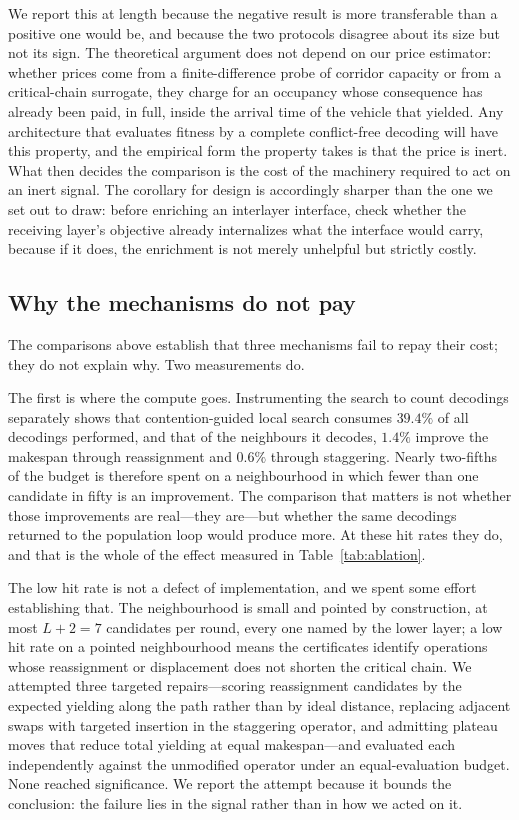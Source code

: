 \documentclass[manuscript,screen,review]{acmart}
\begin{document}
We report this at length because the negative result is more transferable than a
positive one would be, and because the two protocols disagree about its size but
not its sign. The theoretical argument does not depend on our price estimator:
whether prices come from a finite-difference probe of corridor capacity or from a
critical-chain surrogate, they charge for an occupancy whose consequence has
already been paid, in full, inside the arrival time of the vehicle that yielded.
Any architecture that evaluates fitness by a complete conflict-free decoding will
have this property, and the empirical form the property takes is that the price
is inert. What then decides the comparison is the cost of the machinery required
to act on an inert signal. The corollary for design is accordingly sharper than
the one we set out to draw: before enriching an interlayer interface, check
whether the receiving layer's objective already internalizes what the interface
would carry, because if it does, the enrichment is not merely unhelpful but
strictly costly.

\subsection{Why the mechanisms do not pay}
\label{sec:whycost}

The comparisons above establish that three mechanisms fail to repay their cost;
they do not explain why. Two measurements do.

The first is where the compute goes. Instrumenting the search to count
decodings separately shows that contention-guided local search consumes
$39.4\%$ of all decodings performed, and that of the neighbours it decodes,
$1.4\%$ improve the makespan through reassignment and $0.6\%$ through
staggering. Nearly two-fifths of the budget is therefore spent on a
neighbourhood in which fewer than one candidate in fifty is an improvement. The
comparison that matters is not whether those improvements are real---they
are---but whether the same decodings returned to the population loop would
produce more. At these hit rates they do, and that is the whole of the effect
measured in Table~\ref{tab:ablation}.

The low hit rate is not a defect of implementation, and we spent some effort
establishing that. The neighbourhood is small and pointed by construction, at
most $L+2=7$ candidates per round, every one named by the lower layer; a
low hit rate on a pointed neighbourhood means the certificates identify
operations whose reassignment or displacement does not shorten the critical
chain. We attempted three targeted repairs---scoring reassignment candidates by
the expected yielding along the path rather than by ideal distance, replacing
adjacent swaps with targeted insertion in the staggering operator, and admitting
plateau moves that reduce total yielding at equal makespan---and evaluated each
independently against the unmodified operator under an equal-evaluation budget.
None reached significance. We report the attempt because it bounds the
conclusion: the failure lies in the signal rather than in how we acted on it.
\end{document}
